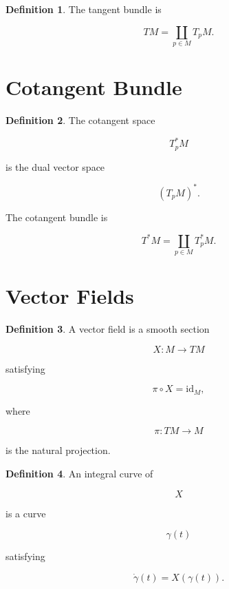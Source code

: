 \documentclass[11pt]{book}
\numberwithin{equation}{chapter}
\theoremstyle{definition}
\newtheorem{definition}{Definition}[chapter]
\theoremstyle{plain}
\begin{document}

\begin{definition}

The tangent bundle is

\[
TM
=
\coprod_{p\in M}
T_pM.
\]

\end{definition}


\section{Cotangent Bundle}

\begin{definition}

The cotangent space

\[
T_p^*M
\]

is the dual vector space

\[
(T_pM)^*.
\]

The cotangent bundle is

\[
T^*M
=
\coprod_{p\in M}
T_p^*M.
\]

\end{definition}


\section{Vector Fields}

\begin{definition}

A vector field is a smooth section

\[
X:M\rightarrow TM
\]

satisfying

\[
\pi\circ X=\mathrm{id}_M,
\]

where

\[
\pi:TM\rightarrow M
\]

is the natural projection.

\end{definition}


\begin{definition}

An integral curve of

\[
X
\]

is a curve

\[
\gamma(t)
\]

satisfying

\[
\dot\gamma(t)
=
X(\gamma(t)).
\]

\end{definition}
\end{document}
